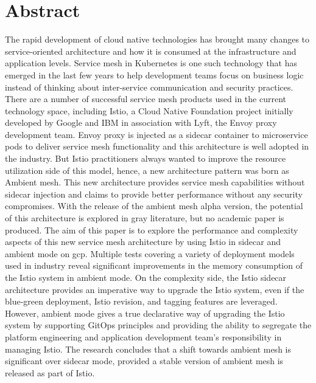 \section*{Abstract}
The rapid development of cloud native technologies has brought many changes to service-oriented architecture and how it is consumed at the infrastructure and application levels. Service mesh in Kubernetes is one such technology that has emerged in the last few years to help development teams focus on business logic instead of thinking about inter-service communication and security practices. There are a number of successful service mesh products used in the current technology space, including Istio, a Cloud Native Foundation project initially developed by Google and IBM in association with Lyft, the Envoy proxy development team. Envoy proxy is injected as a sidecar container to microservice pods to deliver service mesh functionality and this architecture is well adopted in the industry. But Istio practitioners always wanted to improve the resource utilization side of this model, hence, a new architecture pattern was born as Ambient mesh. This new architecture provides service mesh capabilities without sidecar injection and claims to provide better performance without any security compromises. With the release of the ambient mesh alpha version, the potential of this architecture is explored in gray literature, but no academic paper is produced. The aim of this paper is to explore the performance and complexity aspects of this new service mesh architecture by using Istio in sidecar and ambient mode on \acrfull{gcp}. Multiple tests covering a variety of deployment models used in industry reveal significant improvements in the memory consumption of the Istio system in ambient mode. On the complexity side, the Istio sidecar architecture provides an imperative way to upgrade the Istio system, even if the blue-green deployment, Istio revision, and tagging features are leveraged. However, ambient mode gives a true declarative way of upgrading the Istio system by supporting GitOps principles and providing the ability to segregate the platform engineering and application development team's responsibility in managing Istio. The research concludes that a shift towards ambient mesh is significant over sidecar mode, provided a stable version of ambient mesh is released as part of Istio.